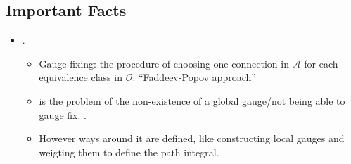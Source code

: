 \subsection{Important Facts}
\begin{itemize}
    \item {}.
    \begin{itemize}
        \item Gauge fixing: the procedure of choosing one connection in $\mathcal A$ for each equivalence class in $\mathcal O$. ``Faddeev-Popov approach''
        
        \item {} is the problem of the non-existence of a global gauge/not being able to gauge fix. .
        
        \item However ways around it are defined, like constructing local gauges and weigting them to define the path integral.
    \end{itemize}
\end{itemize}